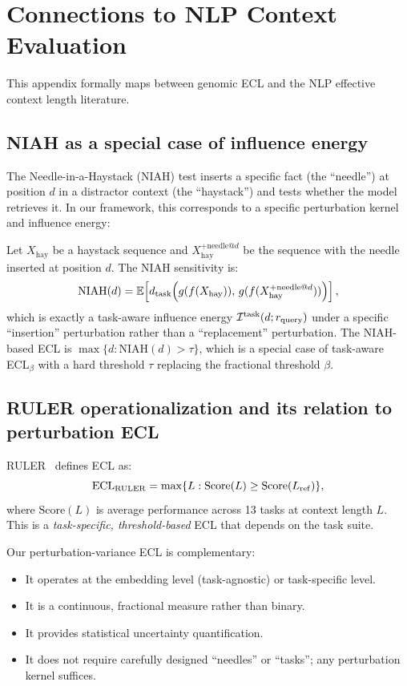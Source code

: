 \section{Connections to NLP Context Evaluation}\label{app:nlp}

This appendix formally maps between genomic ECL and the NLP effective context length literature.

\subsection{NIAH as a special case of influence energy}

The Needle-in-a-Haystack (NIAH) test inserts a specific fact (the ``needle'') at position $d$ in a distractor context (the ``haystack'') and tests whether the model retrieves it. In our framework, this corresponds to a specific perturbation kernel and influence energy:

Let $X_{\mathrm{hay}}$ be a haystack sequence and $X_{\mathrm{hay}}^{+\mathrm{needle}@d}$ be the sequence with the needle inserted at position $d$. The NIAH sensitivity is:
\[
\mathrm{NIAH}(d) = \mathbb{E}\!\left[d_{\mathrm{task}}\!\left(g(f(X_{\mathrm{hay}})),\, g(f(X_{\mathrm{hay}}^{+\mathrm{needle}@d}))\right)\right],
\]
which is exactly a task-aware influence energy $\mathcal{I}^{\mathrm{task}}(d; r_{\mathrm{query}})$ under a specific ``insertion'' perturbation rather than a ``replacement'' perturbation. The NIAH-based ECL is $\max\{d : \mathrm{NIAH}(d) > \tau\}$, which is a special case of task-aware ECL$_\beta$ with a hard threshold $\tau$ replacing the fractional threshold $\beta$.

\subsection{RULER operationalization and its relation to perturbation ECL}

RULER~\citep{Hsieh2024RULER} defines ECL as:
\[
\mathrm{ECL}_{\mathrm{RULER}} = \max\{L : \mathrm{Score}(L) \ge \mathrm{Score}(L_{\mathrm{ref}})\},
\]
where $\mathrm{Score}(L)$ is average performance across 13 tasks at context length $L$. This is a \emph{task-specific, threshold-based} ECL that depends on the task suite.

Our perturbation-variance ECL is complementary:
\begin{itemize}[leftmargin=2em]
\item It operates at the embedding level (task-agnostic) or task-specific level.
\item It is a continuous, fractional measure rather than binary.
\item It provides statistical uncertainty quantification.
\item It does not require carefully designed ``needles'' or ``tasks''; any perturbation kernel suffices.
\end{itemize}

